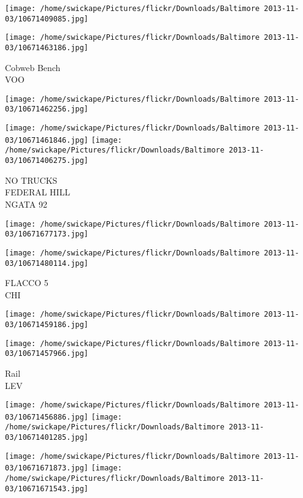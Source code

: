 \documentclass[10pt,letterpaper]{article}
\begin{document}
\texttt{[image: /home/swickape/Pictures/flickr/Downloads/Baltimore 2013-11-03/10671409085.jpg]}

\vspace{0.25in}
\texttt{[image: /home/swickape/Pictures/flickr/Downloads/Baltimore 2013-11-03/10671463186.jpg]}

Cobweb Bench\\
VOO\\
\pagebreak

\texttt{[image: /home/swickape/Pictures/flickr/Downloads/Baltimore 2013-11-03/10671462256.jpg]}

\vspace{0.25in}
\texttt{[image: /home/swickape/Pictures/flickr/Downloads/Baltimore 2013-11-03/10671461846.jpg]}
\texttt{[image: /home/swickape/Pictures/flickr/Downloads/Baltimore 2013-11-03/10671406275.jpg]}

NO TRUCKS\\
FEDERAL HILL\\
NGATA 92\\
\pagebreak

\texttt{[image: /home/swickape/Pictures/flickr/Downloads/Baltimore 2013-11-03/10671677173.jpg]}

\vspace{0.25in}
\texttt{[image: /home/swickape/Pictures/flickr/Downloads/Baltimore 2013-11-03/10671480114.jpg]}

FLACCO 5\\
CHI\\
\pagebreak

\texttt{[image: /home/swickape/Pictures/flickr/Downloads/Baltimore 2013-11-03/10671459186.jpg]}

\vspace{0.25in}
\texttt{[image: /home/swickape/Pictures/flickr/Downloads/Baltimore 2013-11-03/10671457966.jpg]}

Rail\\
LEV\\
\pagebreak

\texttt{[image: /home/swickape/Pictures/flickr/Downloads/Baltimore 2013-11-03/10671456886.jpg]}
\texttt{[image: /home/swickape/Pictures/flickr/Downloads/Baltimore 2013-11-03/10671401285.jpg]}

\texttt{[image: /home/swickape/Pictures/flickr/Downloads/Baltimore 2013-11-03/10671671873.jpg]}
\texttt{[image: /home/swickape/Pictures/flickr/Downloads/Baltimore 2013-11-03/10671671543.jpg]}
\end{document}
